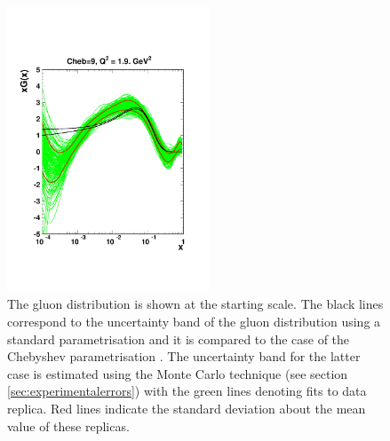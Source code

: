 \begin{figure}[!ht]
 \centering
  \includegraphics[trim=1cm 4cm 1cm 5cm, clip, width=6cm]{chebishev.pdf}
  \caption{The gluon distribution is shown at the starting scale. The black lines correspond to the uncertainty band of the gluon distribution using a standard parametrisation and it is compared to the case of the Chebyshev parametrisation \cite{Chebyshev}. The uncertainty band for the latter case is estimated using the Monte Carlo technique (see section \ref{sec:experimentalerrors}) with the green lines denoting fits to data replica.  Red lines indicate the standard deviation about the mean value of these replicas.}
 \label{fig:cheb}
\end{figure}

%
